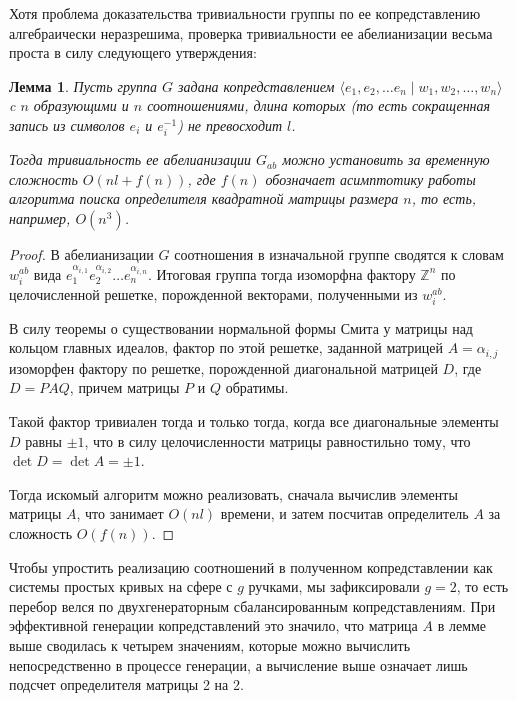 \documentclass[a4paper, 12pt]{article}
\newtheorem*{lemma}{Лемма}
\begin{document}
    Хотя проблема доказательства тривиальности группы по ее копредставлению алгебраически неразрешима, проверка тривиальности ее абелианизации весьма проста в силу следующего утверждения:

    \begin{lemma}
        Пусть группа $G$ задана копредставлением $\langle e_1, e_2, \dots e_n \mid w_1, w_2, \dots, w_n \rangle$ c $n$ образующими и $n$ соотношениями, длина которых (то есть сокращенная запись из символов $e_i$ и $e_i^{-1}$) не превосходит $l$.
        
        Тогда тривиальность ее абелианизации $G_{ab}$ можно установить за временную сложность $O(n l + f(n))$, где $f(n)$ обозначает асимптотику работы алгоритма поиска определителя квадратной матрицы размера $n$, то есть, например, $O(n^3)$.
    \end{lemma}

    \begin{proof}
        В абелианизации $G$ соотношения в изначальной группе сводятся к словам $w^{ab}_i$ вида $e_1^{\alpha_{i, 1}} e_2^{\alpha_{i, 2}} \dots e_n^{\alpha_{i, n}}$. Итоговая группа тогда изоморфна фактору $\mathbb{Z}^n$ по целочисленной решетке, порожденной векторами, полученными из $w^{ab}_i$.

        В силу теоремы о существовании нормальной формы Смита у матрицы над кольцом главных идеалов, фактор по этой решетке, заданной матрицей $A = \alpha_{i, j}$ изоморфен фактору по решетке, порожденной диагональной матрицей $D$, где $D = P A Q$, причем матрицы $P$ и $Q$ обратимы.

        Такой фактор тривиален тогда и только тогда, когда все диагональные элементы $D$ равны $\pm 1$, что в силу целочисленности матрицы равностильно тому, что $\det D = \det A = \pm 1$.

        Тогда искомый алгоритм можно реализовать, сначала вычислив элементы матрицы $A$, что занимает $O(n l)$ времени, и затем посчитав определитель $A$ за сложность $O(f(n))$.
    \end{proof}

    Чтобы упростить реализацию соотношений в полученном копредставлении как системы простых кривых на сфере с $g$ ручками, мы зафиксировали $g = 2$, то есть перебор велся по двухгенераторным сбалансированным копредставлениям. При эффективной генерации копредставлений это значило, что матрица $A$ в лемме выше сводилась к четырем значениям, которые можно вычислить непосредственно в процессе генерации, а вычисление выше означает лишь подсчет определителя матрицы 2 на 2.
\end{document}
